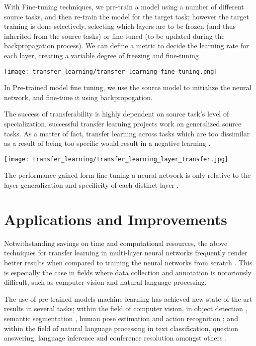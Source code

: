 With Fine-tuning techniques, we pre-train a model using a number of different source tasks, and then re-train the model for the target task; however the target training is done selectively, selecting which layers are to be frozen (and thus inherited from the source tasks) or fine-tuned (to be updated during the backpropagation process). We can define a metric to decide the learning rate for each layer, creating a variable degree of freezing and fine-tuning \citep{madhavan2016}. 

\begin{marginfigure}
  \texttt{[image: transfer\_learning/transfer-learning-fine-tuning.png]}
  \caption{In Pre-trained model fine tuning, we use the source model to initialize the neural network, and fine-tune it using backpropogation.}
  \label{fig:transferlearning_pretrained_finetuning}
 
\end{marginfigure}

The success of transferability is highly dependent on source task's level of specialization, successful transfer learning projects work on generalized source tasks. As a matter of fact, transfer learning across tasks which are too dissimilar as a result of being too specific would result in a negative learning \citep{rosenstein2005}.

\begin{marginfigure}
  \texttt{[image: transfer\_learning/transfer\_learning\_layer\_transfer.jpg]}
  \caption{The performance gained form fine-tuning a neural network is only relative to the layer generalization and specificity of each distinct layer \citep{yosinski2014}.}
  \label{fig:transferlearning_pretrained_finetuning}
\end{marginfigure}

\section{Applications and Improvements}\label{sec:transfer-learning-applications-improvements}

Notwithstanding savings on time and computational resources, the above techniques for transfer learning in multi-layer neural networks frequently render better results when compared to training the neural networks from scratch \citep{yosinski2014}. This is especially the case in fields where data collection and annotation is notoriously difficult, such as computer vision and natural language processing. 

The use of pre-trained models machine learning has achieved new state-of-the-art results in several tasks; within the field of computer vision, in object detection \citep{he2017}, semantic segmentation \citep{zhao2016}, human pose estimation \citep{papandreou2017} and action recognition \citep{carreira2017} ; and within the field of natural language processing in text classification, question answering, language inference and conference resolution amongst others \citep{howard2018} \citep{joshi2018}. 

